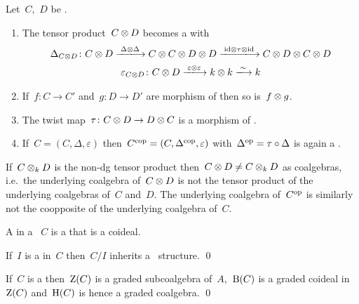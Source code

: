 \documentclass[a4paper,10pt,headings=standardclasses]{scrartcl}
\begin{document}
\begin{lemma}
  Let~$C$,~$D$ be {\dgcs}.
  \begin{enumerate}
    \item
      The tensor product~$C \otimes D$ becomes a {\dgc} with
      \begin{gather*}
        \Delta_{C \tensor D}
        \colon
        C \tensor D
        \xlongto{\Delta \tensor \Delta}
        C \tensor C \tensor D \tensor D
        \xlongto{{\id} \tensor \tau \tensor {\id}}
        C \tensor D \tensor C \tensor D
        \\
        \varepsilon_{C \tensor D}
        \colon
        C \tensor D
        \xlongto{\varepsilon \tensor \varepsilon}
        k \tensor k
        \xlongto{\sim}
        k
      \end{gather*}
    \item
      If~$f \colon C \to C'$ and~$g \colon D \to D'$ are morphism of {\dgcs} then so is~$f \otimes g$.
    \item
      The twist map~$\tau \colon C \otimes D \to D \otimes C$ is a morphism of {\dgcs}.
    \item
      If~$C = (C, \Delta, \varepsilon)$ then~$C^{\mathrm{cop}} = (C, \Delta^{\mathrm{cop}}, \varepsilon)$ with~$\Delta^{\mathrm{op}} = \tau \circ \Delta$ is again a {\dgc}.
  \end{enumerate}
\end{lemma}

\begin{warning}
  If~$C \otimes_k D$ is the non-dg tensor product then~$C \otimes D \neq C \otimes_k D$ as coalgebras, i.e.\ the underlying coalgebra of~$C \otimes D$ is not the tensor product of the underlying coalgebras of~$C$ and~$D$.
  The underlying coalgebra of~$C^{\mathrm{op}}$ is similarly not the coopposite of the underlying coalgebra of~$C$.
\end{warning}

\begin{definition}
  A  in a {\dgc}~$C$ is a {\dgsub} that is a coideal.
\end{definition}

\begin{lemma}
  If~$I$ is a {\dgci} in~$C$ then~$C/I$ inherits a~{\dgc} structure.
  \qed
\end{lemma}

\begin{proposition}
  If~$C$ is a {\dgc} then~$\operatorname{Z}(C)$ is a graded subcoalgebra of~$A$,~$\operatorname{B}(C)$ is a graded coideal in~$\operatorname{Z}(C)$ and~$\operatorname{H}(C)$ is hence a graded coalgebra.
  \qed
\end{proposition}
\end{document}
